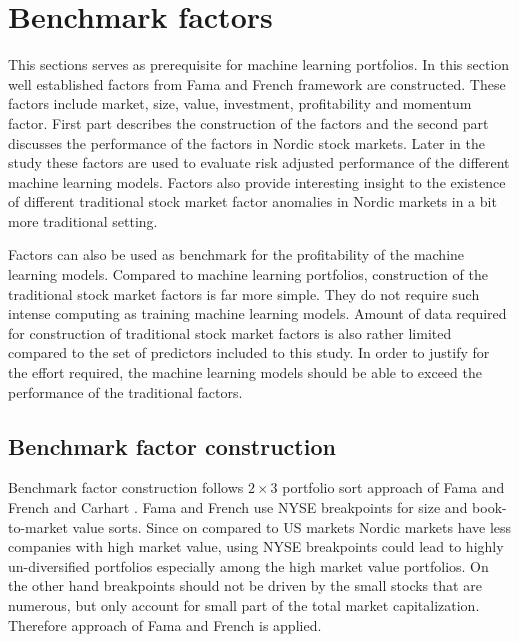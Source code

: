 \documentclass{article}
\begin{document}

\section{Benchmark factors} \label{BenchmarkFactors}

This sections serves as prerequisite for machine learning portfolios. In this section well established factors from Fama and French \citeyear{FAMA20151} framework are constructed. These factors include market, size, value, investment, profitability and momentum factor.  First part describes the construction of the factors and the second part discusses the performance of the factors in Nordic stock markets. Later in the study these factors are used to evaluate risk adjusted performance of the different machine learning models. Factors also provide interesting insight to the existence of different traditional stock market factor anomalies in Nordic markets in a bit more traditional setting. 

Factors can also be used as benchmark for the profitability of the machine learning models. Compared to machine learning portfolios, construction of the traditional stock market factors is far more simple. They do not require such intense computing as training machine learning models. Amount of data required for construction of traditional stock market factors is also rather limited compared to the set of predictors included to this study. In order to justify for the effort required, the machine learning models should be able to exceed the performance of the traditional factors.

\subsection{Benchmark factor construction}\label{BenchmarkFactorsConstruction}

Benchmark factor construction follows $2 \times 3$ portfolio sort approach of Fama and French \citeyear{FAMA19933, FAMA20151} and Carhart \citeyear{Carhart1997}. Fama and French \citeyear{FAMA19933} use NYSE breakpoints for size and book-to-market value sorts. Since on compared to US markets Nordic markets have less companies with high market value, using NYSE breakpoints could lead to highly un-diversified portfolios especially among the high market value portfolios. On the other hand breakpoints should not be driven by the small stocks that are numerous, but only account for small part of the total market capitalization. Therefore approach of Fama and French \citeyear{FAMA2012457} is applied.  \par
\end{document}
